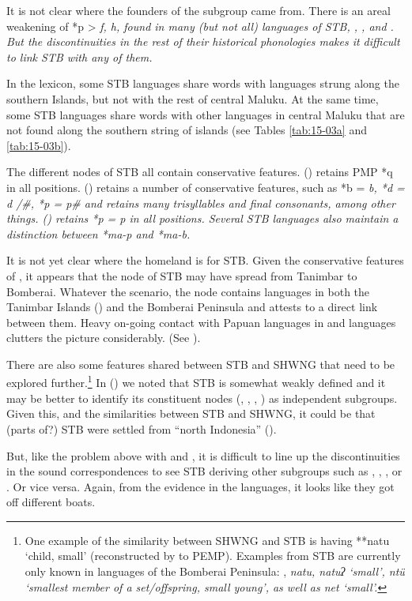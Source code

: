 It is not clear where the founders of the  subgroup came from.
There is an areal weakening of *p > \it{f,
h}, {\0} found in many (but not all) languages of STB,
, , and .
But the discontinuities in the rest of their historical phonologies
makes it difficult to link STB with any of them.

In the lexicon, some STB languages share words with languages
strung along the southern Islands,
but not with the rest of central Maluku.
At the same time,
some STB languages share words with other languages in central
Maluku that are not found along the southern string of islands
(see Tables \ref{tab:15-03a} and \ref{tab:15-03b}).

The different nodes of STB all contain conservative features.
 () retains PMP *q in all positions.
 () retains a number of conservative
features, such as *b = \it{b},
*d = \it{d /{\#}{\gap}},
*p = \it{p}{\#} and retains many trisyllables
and final consonants, among other things.
 () retains *p = \it{p} in all positions.
Several STB languages also maintain a distinction between *ma-p and *ma-b.

It is not yet clear where the homeland is for STB.
Given the conservative features of ,
it appears that the  node of STB may have
spread from Tanimbar to Bomberai.
Whatever the scenario, the  node
contains languages in both the Tanimbar Islands ()
and the Bomberai Peninsula
and attests to a direct link between them.
Heavy on-going contact with Papuan languages in 
and  languages clutters the picture considerably. (See ).

There are also some features shared between STB
and SHWNG that need to be explored further.\footnote{
		One example of the similarity between SHWNG
		and STB is having **natu ‘child,
		small’ (reconstructed by \citealt{BlustTrussel2020} to PEMP).
		Examples from STB are currently only known in languages of the
		Bomberai Peninsula: ,  \it{natu},  \it{natuʔ} ‘small’,
		 \it{ntü}
		‘smallest member of a set/offspring,
		small young’, as well as  \it{net} ‘small’.}
In 
() we noted that STB is somewhat weakly defined
and it may be better to identify its constituent nodes (, , , )
as independent subgroups.
Given this, and the similarities between STB
and SHWNG, it could be that (parts of?) STB were
settled from “north Indonesia” ().

But, like the problem above with 
and , it is difficult to line up the discontinuities
in the sound correspondences to see STB deriving other subgroups
such as , , , or .
Or vice versa.
Again, from the evidence in the languages,
it looks like they got off different boats.